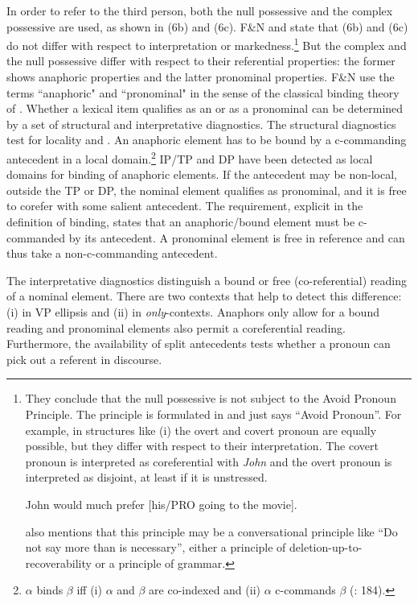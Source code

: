 \documentclass[output=paper]{langsci/langscibook}
\begin{document}
In order to refer to the third person, both the null possessive and the complex possessive are used, as shown in (6b) and (6c). F\&N and \citet{Rodrigues2010} state that (6b) and (6c) do not differ with respect to interpretation or markedness.\footnote{They conclude that the null possessive is not subject to the Avoid Pronoun Principle. The principle is formulated in \citet{Chomsky1981} and just says “Avoid Pronoun”. For example, in structures like (i) the overt and covert pronoun are equally possible, but they differ with respect to their interpretation. The covert pronoun is interpreted as coreferential with \textit{John} and the overt pronoun is interpreted as disjoint, at least if it is unstressed.

\ea   John would much prefer [his\slash PRO going to the movie].\\
  \z

\citet[65]{Chomsky1981} also mentions that this principle may be a conversational principle like “Do not say more than is necessary”, either a principle of deletion-up-to-recoverability or a principle of grammar.} But the complex and the null possessive differ with respect to their referential properties: the former shows anaphoric properties and the latter pronominal properties. F\&N use the terms “anaphoric" and “pronominal" in the sense of the classical binding theory of \citet{Chomsky1981,Chomsky1986Knowledge}. Whether a lexical item qualifies as an  or as a pronominal can be determined by a set of structural and interpretative diagnostics. The structural diagnostics test for locality and . An anaphoric element has to be bound by a c-commanding antecedent in a local domain.\footnote{$\alpha $ binds $\beta $ iff (i) $\alpha $ and $\beta $ are co-indexed and (ii) $\alpha $ c-commands $\beta $ (\citealt{Chomsky1981}: 184).} IP\slash TP and DP have been detected as local domains for binding of anaphoric elements. If the antecedent may be non-local, outside the TP or DP, the nominal element qualifies as pronominal, and it is free to corefer with some salient antecedent. The  requirement, explicit in the definition of binding, states that an anaphoric\slash bound element must be c-commanded by its antecedent. A pronominal element is free in reference and can thus take a non-c-commanding antecedent.

The interpretative diagnostics distinguish a bound or free (co-referential) reading of a nominal element. There are two contexts that help to detect this difference: (i) in VP ellipsis and (ii) in \textit{only}{}-contexts. Anaphors only allow for a bound reading and pronominal elements also permit a coreferential reading. Furthermore, the availability of split antecedents tests whether a pronoun can pick out a referent in discourse.
\end{document}
